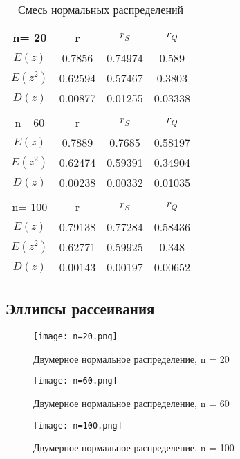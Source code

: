 \documentclass[12pt,a4paper]{scrartcl}
\begin{document}
\begin{table}[H]
\centering
\begin{tabular}{| c | c | c | c |}
\hline
 n= 20    & r       & $r_S$   & $r_Q$   \\ \hline
 $E(z)$   & 0.7856  & 0.74974 & 0.589   \\ \hline
 $E(z^2)$ & 0.62594 & 0.57467 & 0.3803  \\ \hline
 $D(z)$   & 0.00877 & 0.01255 & 0.03338 \\ \hline
&  & & \\  \hline
 n= 60    & r       & $r_S$   & $r_Q$   \\ \hline
 $E(z)$   & 0.7889  & 0.7685  & 0.58197 \\ \hline
 $E(z^2)$ & 0.62474 & 0.59391 & 0.34904 \\ \hline
 $D(z)$   & 0.00238 & 0.00332 & 0.01035 \\ \hline
&  & & \\  \hline
 n= 100   & r       & $r_S$   & $r_Q$   \\ \hline
 $E(z)$   & 0.79138 & 0.77284 & 0.58436 \\ \hline
 $E(z^2)$ & 0.62771 & 0.59925 & 0.348   \\ \hline
 $D(z)$   & 0.00143 & 0.00197 & 0.00652 \\
\hline
\end{tabular}
 \caption{Смесь нормальных распределений}
\label{tab:mix}
\end{table}

\subsection{Эллипсы рассеивания}
	
	\begin{figure}[H]
	    \centering
	    \texttt{[image: n=20.png]}
	    \caption{ Двумерное нормальное распределение, n = 20}
	    \label{fig:f20}
	\end{figure}
	
	\begin{figure}[H]
	    \centering
	    \texttt{[image: n=60.png]}
	    \caption{Двумерное нормальное распределение, n = 60}
	    \label{fig:f60}
	\end{figure}
	
	\begin{figure}[H]
	    \centering
	    \texttt{[image: n=100.png]}
	    \caption{Двумерное нормальное распределение, n = 100}
	    \label{fig:f100}
	\end{figure}
\end{document}
